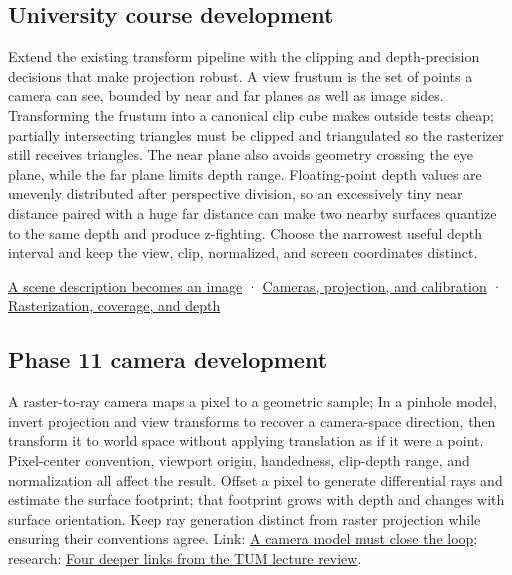 \subsection{University course development}\label{university-course-development}

Extend the existing transform pipeline with the clipping and depth-precision decisions that make projection robust. A view frustum is the set of points a camera can see, bounded by near and far planes as well as image sides. Transforming the frustum into a canonical clip cube makes outside tests cheap; partially intersecting triangles must be clipped and triangulated so the rasterizer still receives triangles. The near plane also avoids geometry crossing the eye plane, while the far plane limits depth range. Floating-point depth values are unevenly distributed after perspective division, so an excessively tiny near distance paired with a huge far distance can make two nearby surfaces quantize to the same depth and produce z-fighting. Choose the narrowest useful depth interval and keep the view, clip, normalized, and screen coordinates distinct.

\href{Continuous\%20Notes/University\%20-\%20Worlds,\%20Images\%20and\%20Inference\%20-\%20Graphics,\%20Vision\%20and\%20Photography\#A\%20scene\%20description\%20becomes\%20an\%20image}{A scene description becomes an image} · \href{Continuous\%20Notes/University\%20-\%20Worlds,\%20Images\%20and\%20Inference\%20-\%20Graphics,\%20Vision\%20and\%20Photography\#Cameras,\%20projection,\%20and\%20calibration}{Cameras, projection, and calibration} · \href{Continuous\%20Notes/University\%20-\%20Worlds,\%20Images\%20and\%20Inference\%20-\%20Graphics,\%20Vision\%20and\%20Photography\#Rasterization,\%20coverage,\%20and\%20depth}{Rasterization, coverage, and depth}

\subsection{Phase 11 camera development}\label{phase-11-camera-development}

A raster-to-ray camera maps a pixel to a geometric sample; In a pinhole model, invert projection and view transforms to recover a camera-space direction, then transform it to world space without applying translation as if it were a point. Pixel-center convention, viewport origin, handedness, clip-depth range, and normalization all affect the result. Offset a pixel to generate differential rays and estimate the surface footprint; that footprint grows with depth and changes with surface orientation. Keep ray generation distinct from raster projection while ensuring their conventions agree. Link: \href{Continuous\%20Notes/Computing\%20Foundations\%20-\%20From\%20Bits\%20to\%20C++\%20and\%20Systems\%20APIs\#A\%20camera\%20model\%20must\%20close\%20the\%20loop}{A camera model must close the loop}; research: \href{Continuous\%20Notes/Computing\%20Foundations\%20-\%20From\%20Bits\%20to\%20C++\%20and\%20Systems\%20APIs\#Four\%20deeper\%20links\%20from\%20the\%20TUM\%20lecture\%20review}{Four deeper links from the TUM lecture review}.
